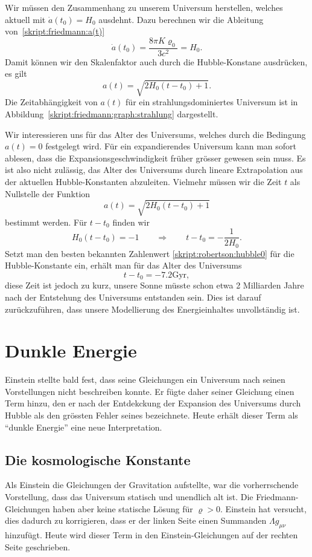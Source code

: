 Wir müssen den Zusammenhang zu unserem Universum herstellen, welches
aktuell mit $\dot a(t_0)= H_0$ ausdehnt.
Dazu berechnen wir die Ableitung von~\eqref{skript:friedmann:a(t)}
\[
\dot a(t_0)=\frac{8\pi K\varrho_0}{3c^2}=H_0.
\]
Damit können wir den Skalenfaktor auch durch die Hubble-Konstane ausdrücken,
es gilt
\begin{equation}
a(t)=\sqrt{2H_0(t-t_0)+1}.
\label{skript:friedmann:a(t):strahlung}
\end{equation}
Die Zeitabhängigkeit von $a(t)$ für ein strahlungsdominiertes Universum
ist in Abbildung~\ref{skript:friedmann:graph:strahlung} dargestellt.

Wir interessieren uns für das Alter des Universums, welches durch
die Bedingung $a(t)=0$ festgelegt wird.
Für ein expandierendes Universum kann man sofort ablesen, dass
die Expansionsgeschwindigkeit früher grösser gewesen sein muss.
Es ist also nicht zulässig, das Alter des Universums durch lineare
Extrapolation aus der aktuellen Hubble-Konstanten abzuleiten.
Vielmehr müssen wir die Zeit $t$ als Nullstelle der Funktion
\[
a(t)=\sqrt{2H_0(t-t_0)+1}
\]
bestimmt werden.
Für $t-t_0$ finden wir
\[
H_0(t-t_0)
=
-1
\qquad\Rightarrow\qquad
t-t_0 = -\frac1{2H_0}.
\]
Setzt man den besten bekannten Zahlenwert
\eqref{skript:robertson:hubble0}
für die Hubble-Konstante ein,
erhält man für das Alter des Universums
\[
t-t_0=-7.2\text{Gyr},
\]
diese Zeit ist jedoch zu kurz, unsere Sonne müsste schon etwa
2 Milliarden Jahre nach der Entstehung des Universums entstanden
sein.
Dies ist darauf zurückzuführen, dass unsere Modellierung des
Energieinhaltes unvollständig ist.



\section{Dunkle Energie}
Einstein stellte bald fest, dass seine Gleichungen ein Universum nach
seinen Vorstellungen nicht beschreiben konnte.
Er fügte daher seiner Gleichung einen Term hinzu, den er nach der
Entdekckung der Expansion des Universums durch Hubble als
den grössten Fehler seines bezeichnete.
Heute erhält dieser Term als ``dunkle Energie'' eine neue Interpretation.

\subsection{Die kosmologische Konstante}
Als Einstein die Gleichungen der Gravitation aufstellte, war die
vorherrschende Vorstellung, dass das Universum statisch und unendlich
alt ist.
Die Friedmann-Gleichungen haben aber keine statische Lösung
für $\varrho>0$.
Einstein hat versucht, dies dadurch zu korrigieren, dass er der
linken Seite einen Summanden $\Lambda g_{\mu\nu}$ hinzufügt.
Heute wird dieser Term in den Einstein-Gleichungen auf der rechten
Seite geschrieben.


